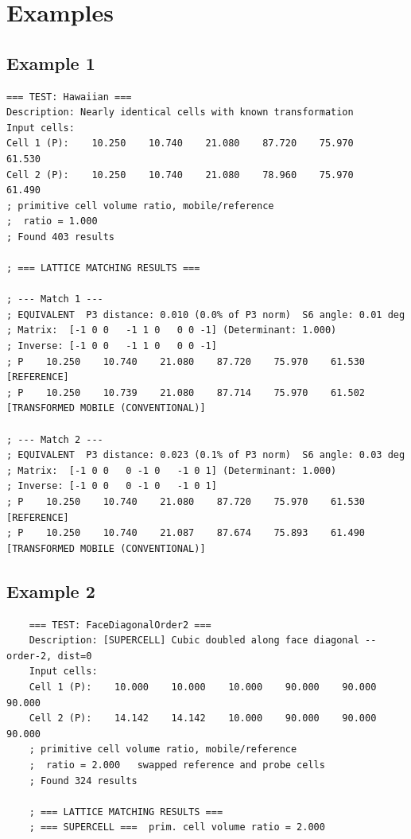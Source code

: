 \documentclass[preprint]{iucr}              %
\numberwithin{equation}{section}
\begin{document}
	\section{Examples}
	
	\subsection{Example 1}
{
\begin{verbatim}
=== TEST: Hawaiian ===
Description: Nearly identical cells with known transformation
Input cells:
Cell 1 (P):    10.250    10.740    21.080    87.720    75.970    61.530 
Cell 2 (P):    10.250    10.740    21.080    78.960    75.970    61.490 
; primitive cell volume ratio, mobile/reference
;  ratio = 1.000
; Found 403 results

; === LATTICE MATCHING RESULTS ===

; --- Match 1 ---
; EQUIVALENT  P3 distance: 0.010 (0.0% of P3 norm)  S6 angle: 0.01 deg
; Matrix:  [-1 0 0   -1 1 0   0 0 -1] (Determinant: 1.000)
; Inverse: [-1 0 0   -1 1 0   0 0 -1]
; P    10.250    10.740    21.080    87.720    75.970    61.530  [REFERENCE]
; P    10.250    10.739    21.080    87.714    75.970    61.502  [TRANSFORMED MOBILE (CONVENTIONAL)]

; --- Match 2 ---
; EQUIVALENT  P3 distance: 0.023 (0.1% of P3 norm)  S6 angle: 0.03 deg
; Matrix:  [-1 0 0   0 -1 0   -1 0 1] (Determinant: 1.000)
; Inverse: [-1 0 0   0 -1 0   -1 0 1]
; P    10.250    10.740    21.080    87.720    75.970    61.530  [REFERENCE]
; P    10.250    10.740    21.087    87.674    75.893    61.490  [TRANSFORMED MOBILE (CONVENTIONAL)]

\end{verbatim}

\subsection{Example 2}
\begin{verbatim}
	=== TEST: FaceDiagonalOrder2 ===
	Description: [SUPERCELL] Cubic doubled along face diagonal -- order-2, dist=0
	Input cells:
	Cell 1 (P):    10.000    10.000    10.000    90.000    90.000    90.000 
	Cell 2 (P):    14.142    14.142    10.000    90.000    90.000    90.000 
	; primitive cell volume ratio, mobile/reference
	;  ratio = 2.000   swapped reference and probe cells
	; Found 324 results
	
	; === LATTICE MATCHING RESULTS ===
	; === SUPERCELL ===  prim. cell volume ratio = 2.000
	

\end{verbatim}}
\end{document}
